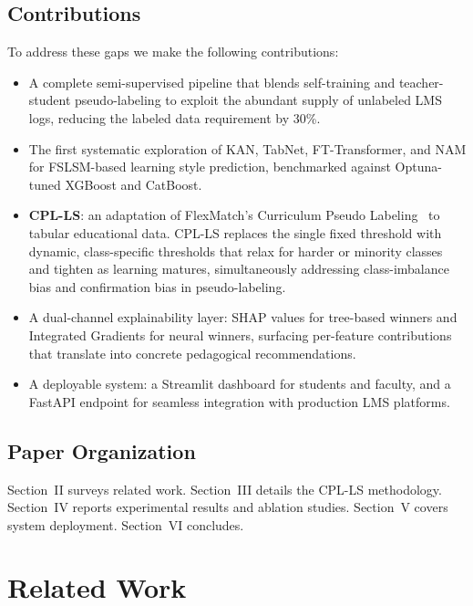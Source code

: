 \documentclass[journal, onecolumn]{IEEEtran}
\begin{document}
\subsection{Contributions}

To address these gaps we make the following contributions:

\begin{itemize}
    \item A complete semi-supervised pipeline that blends self-training and teacher-student pseudo-labeling to exploit the abundant supply of unlabeled LMS logs, reducing the labeled data requirement by 30\%.
    \item The first systematic exploration of KAN, TabNet, FT-Transformer, and NAM for FSLSM-based learning style prediction, benchmarked against Optuna-tuned XGBoost and CatBoost.
    \item \textbf{CPL-LS}: an adaptation of FlexMatch's Curriculum Pseudo Labeling~\cite{zhang2021flexmatch} to tabular educational data. CPL-LS replaces the single fixed threshold with dynamic, class-specific thresholds that relax for harder or minority classes and tighten as learning matures, simultaneously addressing class-imbalance bias and confirmation bias in pseudo-labeling.
    \item A dual-channel explainability layer: SHAP values for tree-based winners and Integrated Gradients for neural winners, surfacing per-feature contributions that translate into concrete pedagogical recommendations.
    \item A deployable system: a Streamlit dashboard for students and faculty, and a FastAPI endpoint for seamless integration with production LMS platforms.
\end{itemize}

\subsection{Paper Organization}

Section~II surveys related work. Section~III details the CPL-LS methodology. Section~IV reports experimental results and ablation studies. Section~V covers system deployment. Section~VI concludes.

\section{Related Work}
\end{document}
